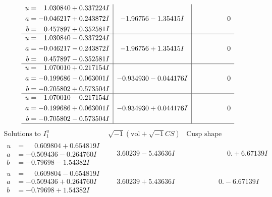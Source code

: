 \documentclass[1p]{elsarticle_modified}
\theoremstyle{definition}
\newcommand{\I}{\sqrt{-1}}
\begin{document}
$$\begin{array}{c|c|c}
\begin{aligned}
u &= \phantom{-}1.030840 + 0.337224 I \\
a &= -0.046217 + 0.243872 I \\
b &= \phantom{-}0.457897 + 0.352581 I\end{aligned}
 & -1.96756 - 1.35415 I & \phantom{-0.000000 } 0 \\ \hline\begin{aligned}
u &= \phantom{-}1.030840 - 0.337224 I \\
a &= -0.046217 - 0.243872 I \\
b &= \phantom{-}0.457897 - 0.352581 I\end{aligned}
 & -1.96756 + 1.35415 I & \phantom{-0.000000 } 0 \\ \hline\begin{aligned}
u &= \phantom{-}1.070010 + 0.217154 I \\
a &= -0.199686 - 0.063001 I \\
b &= -0.705802 + 0.573504 I\end{aligned}
 & -0.934930 - 0.044176 I & \phantom{-0.000000 } 0 \\ \hline\begin{aligned}
u &= \phantom{-}1.070010 - 0.217154 I \\
a &= -0.199686 + 0.063001 I \\
b &= -0.705802 - 0.573504 I\end{aligned}
 & -0.934930 + 0.044176 I & \phantom{-0.000000 } 0\\
 \hline 
 \end{array}$$\newpage$$\begin{array}{c|c|c}  
\text{Solutions to }I^u_{1}& \I (\text{vol} + \sqrt{-1}CS) & \text{Cusp shape}\\
 \hline 
\begin{aligned}
u &= \phantom{-}0.609804 + 0.654819 I \\
a &= -0.509436 - 0.264760 I \\
b &= -0.79698 - 1.54382 I\end{aligned}
 & \phantom{-}3.60239 - 5.43636 I & \phantom{-0.000000 -}0. + 6.67139 I \\ \hline\begin{aligned}
u &= \phantom{-}0.609804 - 0.654819 I \\
a &= -0.509436 + 0.264760 I \\
b &= -0.79698 + 1.54382 I\end{aligned}
 & \phantom{-}3.60239 + 5.43636 I & \phantom{-0.000000 } 0. - 6.67139 I \\ \hline\begin{aligned}

\end{aligned}
\end{array}$$
\end{document}
